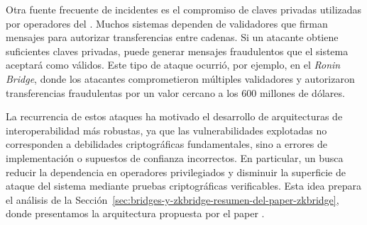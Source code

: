 Otra fuente frecuente de incidentes es el compromiso de claves privadas utilizadas por operadores del \Bridge. Muchos sistemas dependen de validadores que firman mensajes para autorizar transferencias entre cadenas. Si un atacante obtiene suficientes claves privadas, puede generar mensajes fraudulentos que el sistema aceptará como válidos. Este tipo de ataque ocurrió, por ejemplo, en el \emph{Ronin Bridge}, donde los atacantes comprometieron múltiples validadores y autorizaron transferencias fraudulentas por un valor cercano a los 600 millones de dólares. 

La recurrencia de estos ataques ha motivado el desarrollo de arquitecturas de interoperabilidad más robustas, ya que las vulnerabilidades explotadas no corresponden a debilidades criptográficas fundamentales, sino a errores de implementación o supuestos de confianza incorrectos. En particular, un \zkBridge busca reducir la dependencia en operadores privilegiados y disminuir la superficie de ataque del sistema mediante pruebas criptográficas verificables. Esta idea prepara el análisis de la Sección~\ref{sec:bridges-y-zkbridge-resumen-del-paper-zkbridge}, donde presentamos la arquitectura propuesta por el paper \zkBridge.
